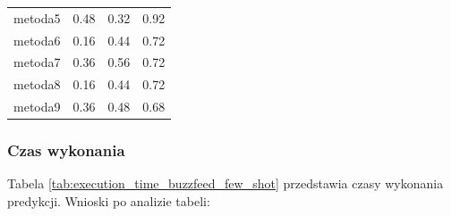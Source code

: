 \begin{table}[H]
\begin{tabular}{lccc}
		metoda5           & 0.48          & 0.32             & 0.92           \\
		metoda6           & 0.16          & 0.44             & 0.72           \\
		metoda7           & 0.36          & 0.56             & 0.72           \\
		metoda8           & 0.16          & 0.44             & 0.72           \\
		metoda9           & 0.36          & 0.48             & 0.68           \\
		\bottomrule
	\end{tabular}
\end{table}

\subsubsection{Czas wykonania}
Tabela \ref{tab:execution_time_buzzfeed_few_shot} przedstawia czasy wykonania predykcji. Wnioski po analizie tabeli:

